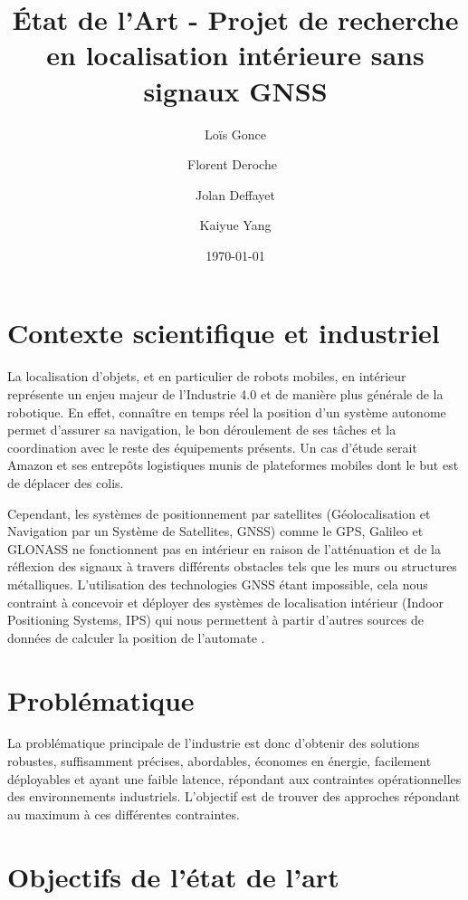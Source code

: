 \documentclass[11pt, a4paper]{article}
\title{\textbf{État de l'Art - Projet de recherche en localisation intérieure sans signaux GNSS}}
\author{Loïs Gonce \and Florent Deroche \and Jolan Deffayet \and Kaiyue Yang}
\date{\today}
\begin{document}

\maketitle
{
	\setlength{\parskip}{0pt}
	\tableofcontents
}
\restoregeometry
\newpage
\section{Contexte scientifique et industriel}


La localisation d’objets, et en particulier de robots mobiles, en intérieur représente un enjeu majeur de l’Industrie 4.0 et de manière plus générale de la robotique. En effet, connaître en temps réel la position d’un système autonome permet d’assurer sa navigation, le bon déroulement de ses tâches et la coordination avec le reste des équipements présents. Un cas d’étude serait Amazon et ses entrepôts logistiques munis de plateformes mobiles dont le but est de déplacer des colis.

Cependant, les systèmes de positionnement par satellites (Géolocalisation et Navigation par un Système de Satellites, GNSS) comme le GPS, Galileo et GLONASS ne fonctionnent pas en intérieur en raison de l’atténuation et de la réflexion des signaux à travers différents obstacles tels que les murs ou structures métalliques.
L’utilisation des technologies GNSS étant impossible, cela nous contraint à concevoir et déployer des systèmes de localisation intérieur (Indoor Positioning Systems, IPS) qui nous permettent à partir d’autres sources de données de calculer la position de l’automate \cite{huangIndoorPositioningSystems2023}.

\section{Problématique}

La problématique principale de l’industrie est donc d’obtenir des solutions robustes, suffisamment précises, abordables, économes en énergie, facilement déployables et ayant une faible latence, répondant aux contraintes opérationnelles des environnements industriels. L’objectif est de trouver des approches répondant au maximum à ces différentes contraintes.

\section{Objectifs de l'état de l'art}
\end{document}
